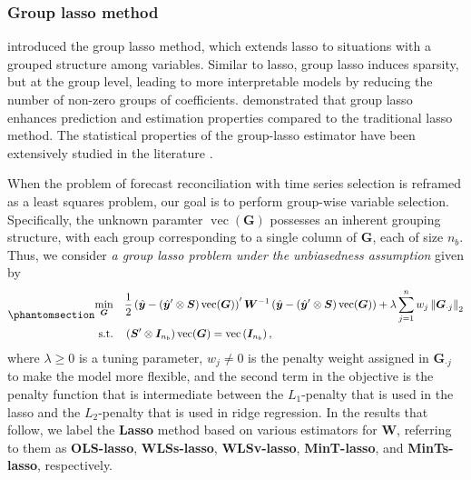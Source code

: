 \documentclass[
  11pt]{article}
\theoremstyle{plain}
\theoremstyle{remark}
\begin{document}
\subsubsection*{Group lasso method}\label{group-lasso-method}

\citet{Yuan2006-mw} introduced the group lasso method, which extends
lasso to situations with a grouped structure among variables. Similar to
lasso, group lasso induces sparsity, but at the group level, leading to
more interpretable models by reducing the number of non-zero groups of
coefficients. \citet{Lounici2011-or} demonstrated that group lasso
enhances prediction and estimation properties compared to the
traditional lasso method. The statistical properties of the group-lasso
estimator have been extensively studied in the literature
\citep[e.g.,][]{Nardi2008-asymptotic}.

When the problem of forecast reconciliation with time series selection
is reframed as a least squares problem, our goal is to perform
group-wise variable selection. Specifically, the unknown paramter
\(\operatorname{vec}(\bm{G})\) possesses an inherent grouping structure,
with each group corresponding to a single column of \(\bm{G}\), each of
size \(n_b\). Thus, we consider \emph{a group lasso problem under the
unbiasedness assumption} given by
\begin{equation}\phantomsection\label{eq-lasso}{
\begin{aligned}
\min_{\bm{G}} \quad & \frac{1}{2}\left(\hat{\bm{y}}-\left(\hat{\bm{y}}^{\prime} \otimes \bm{S}\right) \operatorname{vec}(\bm{G})\right)^{\prime} \bm{W}^{-1}\left(\hat{\bm{y}}-\left(\hat{\bm{y}}^{\prime} \otimes \bm{S}\right) \operatorname{vec}(\bm{G})\right) + \lambda \sum_{j=1}^n w_j \left\|\bm{G}_{\cdot j}\right\|_2 \\
\text{s.t.} \quad & \left(\bm{S}^{\prime} \otimes \bm{I}_{n_b}\right) \operatorname{vec}(\bm{G})=\operatorname{vec}\left(\bm{I}_{n_b}\right),
\end{aligned}
}\end{equation} where \(\lambda \geq 0\) is a tuning parameter,
\(w_j \neq 0\) is the penalty weight assigned in \(\bm{G}_{\cdot j}\) to
make the model more flexible, and the second term in the objective is
the penalty function that is intermediate between the \(L_1\)-penalty
that is used in the lasso and the \(L_2\)-penalty that is used in ridge
regression. In the results that follow, we label the \textbf{Lasso}
method based on various estimators for \(\bm{W}\), referring to them as
\textbf{OLS-lasso}, \textbf{WLSs-lasso}, \textbf{WLSv-lasso},
\textbf{MinT-lasso}, and \textbf{MinTs-lasso}, respectively.
\end{document}
